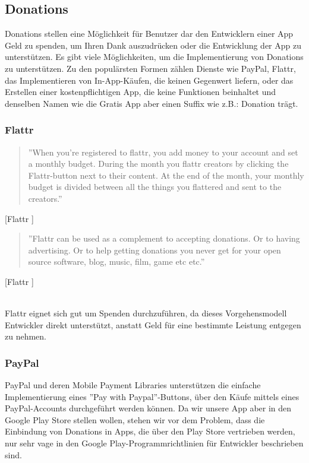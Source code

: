 \documentclass[FIPLY_base.tex]{subfiles}
\begin{document}
\subsection{Donations}
Donations stellen eine Möglichkeit für Benutzer dar den Entwicklern einer App Geld zu spenden, um Ihren Dank auszudrücken oder die Entwicklung der App zu unterstützen.
Es gibt viele Möglichkeiten, um die Implementierung von Donations zu unterstützen.\newline
Zu den populärsten Formen zählen Dienste wie PayPal, Flattr, das Implementieren von In-App-Käufen, die keinen Gegenwert liefern, oder das Erstellen einer kostenpflichtigen App, die keine Funktionen beinhaltet und denselben Namen wie die Gratis App aber einen Suffix wie z.B.: Donation trägt.


\subsubsection{Flattr}
\begin{quote}
''When you're registered to flattr, you add money to your account and set a monthly budget. During the month you flattr creators by clicking the Flattr-button next to their content. At the end of the month, your monthly budget is divided between all the things you flattered and sent to the creators.''
\end{quote}[Flattr \cite{flattr}]

\begin{quote}
''Flattr can be used as a complement to accepting donations. Or to having advertising. Or to help getting donations you never get for your open source software, blog, music, film, game etc etc.''
\end{quote}[Flattr \cite{flattr}]

\ \\
Flattr eignet sich gut um Spenden durchzuführen, da dieses Vorgehensmodell Entwickler direkt unterstützt, anstatt Geld für eine bestimmte Leistung entgegen zu nehmen. 

\newpage
\subsubsection{PayPal}
PayPal und deren Mobile Payment Libraries unterstützen die einfache Implementierung eines ''Pay with Paypal''-Buttons, über den Käufe mittels eines PayPal-Accounts durchgeführt werden können.
Da wir unsere App aber in den Google Play Store stellen wollen, stehen wir vor dem Problem, dass die Einbindung von Donations in Apps, die über den Play Store vertrieben werden, nur sehr vage in den Google Play-Programmrichtlinien für Entwickler beschrieben sind.
\end{document}
